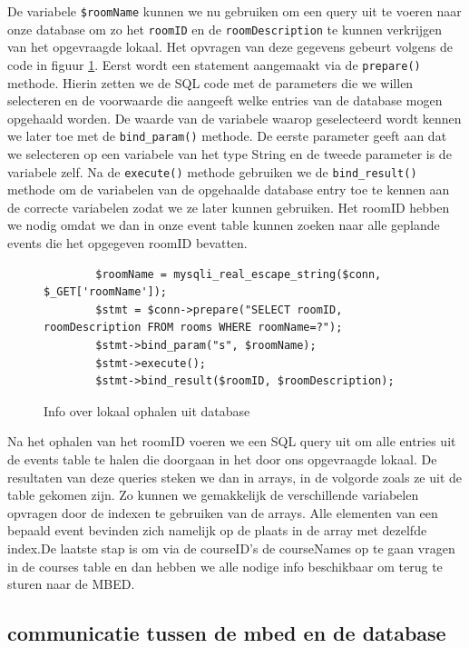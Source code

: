 \documentclass[a4paper,kul]{kulakarticle} %
\begin{document}
De variabele \verb|$roomName| kunnen we nu gebruiken om een query uit te voeren naar onze database om zo het \verb|roomID| en de \verb|roomDescription| te kunnen verkrijgen van het opgevraagde lokaal. Het opvragen van deze gegevens gebeurt volgens de code in figuur \ref{fig:roomsql}. Eerst wordt een statement aangemaakt via de \verb|prepare()| methode. Hierin zetten we de SQL code met de parameters die we willen selecteren en de voorwaarde die aangeeft welke entries van de database mogen opgehaald worden. De waarde van de variabele waarop geselecteerd wordt kennen we later toe met de \verb|bind_param()| methode. De eerste parameter geeft aan dat we selecteren op een variabele van het type String en de tweede parameter is de variabele zelf. Na de \verb|execute()| methode gebruiken we de \verb|bind_result()| methode om de variabelen van de opgehaalde database entry toe te kennen aan de correcte variabelen zodat we ze later kunnen gebruiken.  Het roomID hebben we nodig omdat we dan in onze event table kunnen zoeken naar alle geplande events die het opgegeven roomID bevatten.

\begin{figure}
	\begin{verbatim}
		$roomName = mysqli_real_escape_string($conn, $_GET['roomName']);
		$stmt = $conn->prepare("SELECT roomID, roomDescription FROM rooms WHERE roomName=?");
		$stmt->bind_param("s", $roomName);
		$stmt->execute();
		$stmt->bind_result($roomID, $roomDescription);
	\end{verbatim}
	\caption{Info over lokaal ophalen uit database}
	\label{fig:roomsql}
\end{figure}
\newpage
Na het ophalen van het roomID voeren we een SQL query uit om alle entries uit de events table te halen die doorgaan in het door ons opgevraagde lokaal. De resultaten van deze queries steken we dan in arrays, in de volgorde zoals ze uit de table gekomen zijn. Zo kunnen we gemakkelijk de verschillende variabelen opvragen door de indexen te gebruiken van de arrays. Alle elementen van een bepaald event bevinden zich namelijk op de plaats in de array met dezelfde index.De laatste stap is om via de courseID's de courseNames op te gaan vragen in de courses table en dan hebben we alle nodige info beschikbaar om terug te sturen naar de MBED.


\newpage

\subsection{communicatie tussen de mbed en de database}
\end{document}
